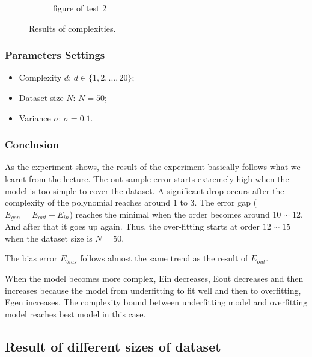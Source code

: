 \documentclass[12pt,letterpaper]{article}
\begin{document}
\begin{figure}[h]
\begin{subfigure}{.55\textwidth}
  \caption{\small figure of test 2}
  \label{fig:sub3}
\end{subfigure}
\caption{\small Results of complexities.}
\label{fig:complex_nonreg}
\end{figure}

\subsubsection*{Parameters Settings}

\begin{itemize}
    \item Complexity $d$: $d \in \{ 1, 2, ..., 20 \}$;
    \item Dataset size $N$: $N = 50$;
    \item Variance $\sigma$: $\sigma = 0.1$.
\end{itemize}

\subsubsection*{Conclusion}

As the experiment shows, the result of the experiment basically follows what we learnt from the lecture. The out-sample error starts extremely high when the model is too simple to cover the dataset. A significant drop occurs after the complexity of the polynomial reaches around $1$ to $3$. The error gap ($E_{gen} = E_{out} - E_{in}$) reaches the minimal when the order becomes around $10 \sim 12$. And after that it goes up again. Thus, the over-fitting starts at order $12 \sim 15$ when the dataset size is $N = 50$.

The bias error $E_{bias}$ follows almost the same trend as the result of $E_{out}$.

When the model becomes more complex, Ein decreases, Eout decreases and then increases because the model from underfitting to fit well and then to overfitting, Egen increases. The complexity bound between underfitting model and overfitting model reaches best model in this case.

\subsection{Result of different sizes of dataset}
\end{document}
